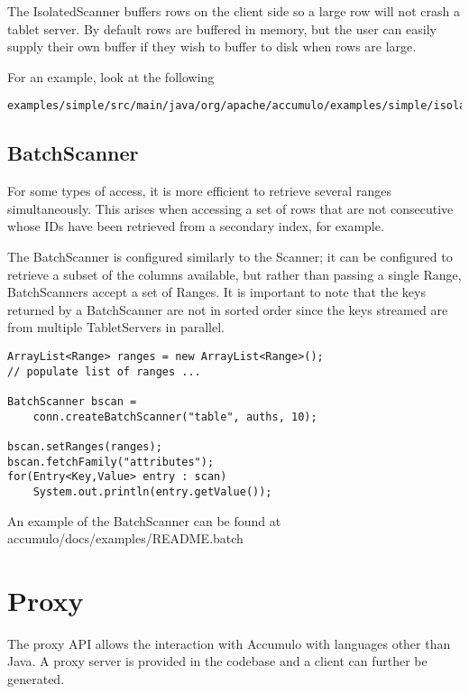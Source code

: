 The IsolatedScanner buffers rows on the client side so a large row will not
crash a tablet server. By default rows are buffered in memory, but the user
can easily supply their own buffer if they wish to buffer to disk when rows are
large.

For an example, look at the following

\begingroup\fontsize{8pt}{8pt}\selectfont\begin{verbatim}
examples/simple/src/main/java/org/apache/accumulo/examples/simple/isolation/InterferenceTest.java
\end{verbatim}\endgroup

\subsection{BatchScanner}

For some types of access, it is more efficient to retrieve several ranges
simultaneously. This arises when accessing a set of rows that are not consecutive
whose IDs have been retrieved from a secondary index, for example.

The BatchScanner is configured similarly to the Scanner; it can be configured to
retrieve a subset of the columns available, but rather than passing a single Range,
BatchScanners accept a set of Ranges. It is important to note that the keys returned
by a BatchScanner are not in sorted order since the keys streamed are from multiple
TabletServers in parallel.

\begingroup\fontsize{8pt}{8pt}\selectfont\begin{verbatim}
ArrayList<Range> ranges = new ArrayList<Range>();
// populate list of ranges ...

BatchScanner bscan =
    conn.createBatchScanner("table", auths, 10);

bscan.setRanges(ranges);
bscan.fetchFamily("attributes");
for(Entry<Key,Value> entry : scan)
    System.out.println(entry.getValue());
\end{verbatim}\endgroup

An example of the BatchScanner can be found at\\
accumulo/docs/examples/README.batch

\section{Proxy}

The proxy API allows the interaction with Accumulo with languages other than Java.
A proxy server is provided in the codebase and a client can further be generated.

